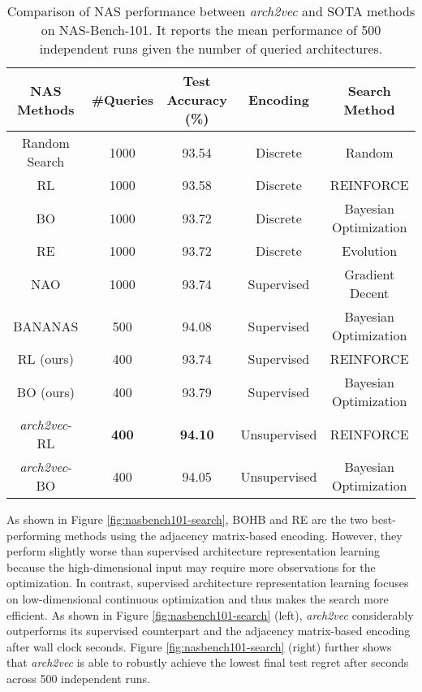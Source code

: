 \begin{table}[t]
\begin{adjustbox}{width=0.9\columnwidth,center}
\scriptsize{
\begin{tabular}{c|c|c|c|c} 
\hline
\textbf{NAS Methods} & \textbf{\#Queries} &  \textbf{Test Accuracy (\%)} & \textbf{Encoding} & \textbf{Search Method} \\ \hline
Random Search \cite{pmlr-v97-ying19a} & 1000 & 93.54 & Discrete & Random \\ 
RL \cite{pmlr-v97-ying19a}  & 1000 & 93.58 & Discrete &  REINFORCE \\ 
BO \cite{pmlr-v97-ying19a} & 1000 & 93.72 & Discrete & Bayesian Optimization \\
RE \cite{pmlr-v97-ying19a}  & 1000 & 93.72 & Discrete &  Evolution \\ \hline
NAO \cite{NAO} & 1000 & 93.74 & Supervised & Gradient Decent \\ 
BANANAS \cite{white2019bananas} & 500 & 94.08 & Supervised & Bayesian Optimization \\ 
RL (ours) & 400 & 93.74 & Supervised & REINFORCE \\
BO (ours) & 400 & 93.79 & Supervised & Bayesian Optimization \\ \hline
\textit{arch2vec}-RL & \textbf{400} & \textbf{94.10} & Unsupervised & REINFORCE \\ 
\textit{arch2vec}-BO & 400 & 94.05 & Unsupervised & Bayesian Optimization \\ \hline
\end{tabular}  
}
\end{adjustbox}
\vspace{1mm}
\caption{Comparison of NAS performance between \textit{arch2vec} and SOTA methods on NAS-Bench-101. It reports the mean performance of 500 independent runs given the number of queried architectures.}
\vspace{-4mm}
\label{table:nasbench101-query-comparison}
\end{table}




As shown in Figure \ref{fig:nasbench101-search}, BOHB and RE are the two best-performing methods using the adjacency matrix-based encoding. However, they perform slightly worse than supervised architecture representation learning because the high-dimensional input may require more observations for the optimization. In contrast, supervised architecture representation learning focuses on low-dimensional continuous optimization and thus makes the search more efficient. As shown in Figure \ref{fig:nasbench101-search} (left), \textit{arch2vec} considerably outperforms its supervised counterpart and the adjacency matrix-based encoding after  wall clock seconds. Figure \ref{fig:nasbench101-search} (right) further shows that \textit{arch2vec} is able to robustly achieve the lowest final test regret after  seconds across 500 independent runs. 










